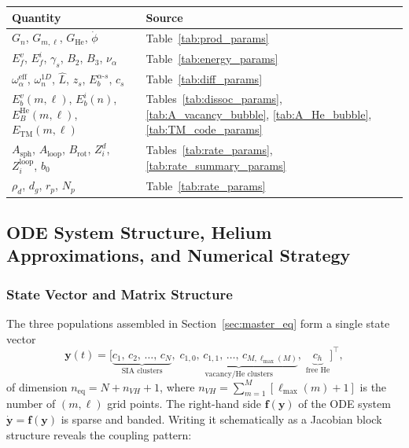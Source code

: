 \begin{center}
\renewcommand{\arraystretch}{1.2}
\begin{tabular}{@{}ll@{}}
\toprule
\textbf{Quantity} & \textbf{Source} \\
\midrule
$G_n$, $G_{m,\ell}$, $G_{\mathrm{He}}$, $\dot{\phi}$
  & Table~\ref{tab:prod_params} \\
$E_f^v$, $E_f^i$, $\gamma_s$, $B_2$, $B_3$, $\nu_\alpha$
  & Table~\ref{tab:energy_params} \\
$\omega_\alpha^{\mathrm{eff}}$, $\omega_n^{1D}$, $\hat{L}$,
  $z_s$, $E_b^{\alpha\text{-}s}$, $c_s$
  & Table~\ref{tab:diff_params} \\
$E_b^v(m,\ell)$, $E_b^i(n)$, $E_B^{\mathrm{He}}(m,\ell)$,
  $E_{\mathrm{TM}}(m,\ell)$
  & Tables~\ref{tab:dissoc_params},
    \ref{tab:A_vacancy_bubble},
    \ref{tab:A_He_bubble},
    \ref{tab:TM_code_params} \\
$A_{\mathrm{sph}}$, $A_{\mathrm{loop}}$, $B_{\mathrm{rot}}$,
  $Z_i^d$, $Z_i^{\mathrm{loop}}$, $b_0$
  & Tables~\ref{tab:rate_params},
    \ref{tab:rate_summary_params} \\
$\rho_d$, $d_g$, $r_p$, $N_p$
  & Table~\ref{tab:rate_params} \\
\bottomrule
\end{tabular}
\end{center}


\subsection{ODE System Structure, Helium Approximations, and Numerical Strategy}
\label{sec:system_size}

\subsubsection{State Vector and Matrix Structure}
\label{sec:matrix_structure}

The three populations assembled in Section~\ref{sec:master_eq} form a
single state vector
\begin{equation}\label{eq:state_vector}
    \mathbf{y}(t)
    =
    \bigl[
      \underbrace{c_1,\,c_2,\,\ldots,\,c_N}_{\text{SIA clusters}},\;
      \underbrace{c_{1,0},\,c_{1,1},\,\ldots,\,c_{M,\ell_{\max}(M)}}_{\text{vacancy/He clusters}},\;
      \underbrace{c_h}_{\text{free He}}
    \bigr]^{\!\top},
\end{equation}
of dimension $n_{\mathrm{eq}} = N + n_{V\!H} + 1$, where
$n_{V\!H} = \sum_{m=1}^{M}[\ell_{\max}(m)+1]$ is the number of
$(m,\ell)$ grid points. The right-hand side $\mathbf{f}(\mathbf{y})$ of
the ODE system $\dot{\mathbf{y}} = \mathbf{f}(\mathbf{y})$ is
sparse and banded. Writing it schematically as a Jacobian block
structure reveals the coupling pattern:

